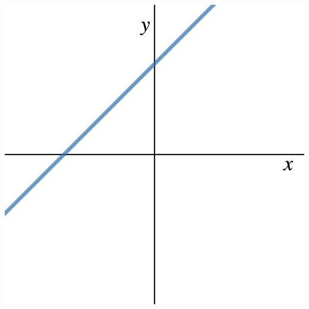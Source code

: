 \documentclass[11pt]{exam}
\theoremstyle{definition}
\begin{document}
\begin{questions}
\begin{enumerate}[(I)]
\begin{minipage}{.35\textwidth}
	\end{minipage}
	\begin{minipage}{.35\textwidth}
	\item \includegraphics[scale=0.1]{Figures/linearVI.png}
	\end{minipage}
\end{enumerate}
\end{questions}
\end{document}
